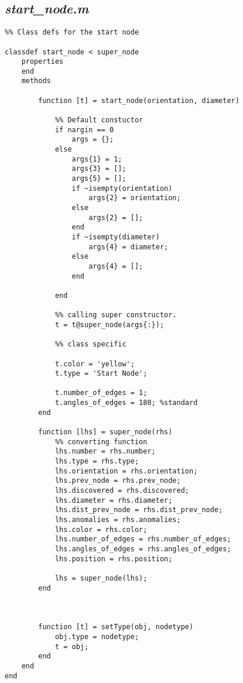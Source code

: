 \subsection{\emph{start\_node.m}}

\begin{lstlisting}
%% Class defs for the start node
 
classdef start_node < super_node
    properties
    end
    methods
        
        function [t] = start_node(orientation, diameter)
            
            %% Default constuctor
            if nargin == 0
                args = {};
            else
                args{1} = 1;
                args{3} = [];
                args{5} = [];
                if ~isempty(orientation)
                    args{2} = orientation;
                else 
                    args{2} = [];
                end
                if ~isempty(diameter)
                    args{4} = diameter;
                else
                    args{4} = [];
                end
                
            end
            
            %% calling super constructor.
            t = t@super_node(args{:});
            
            %% class specific
            
            t.color = 'yellow';
            t.type = 'Start Node';
            
            t.number_of_edges = 1;
            t.angles_of_edges = 180; %standard  
        end
        
        function [lhs] = super_node(rhs)
            %% converting function
            lhs.number = rhs.number;
            lhs.type = rhs.type;
            lhs.orientation = rhs.orientation;
            lhs.prev_node = rhs.prev_node;
            lhs.discovered = rhs.discovered;
            lhs.diameter = rhs.diameter;
            lhs.dist_prev_node = rhs.dist_prev_node;
            lhs.anomalies = rhs.anomalies;
            lhs.color = rhs.color;
            lhs.number_of_edges = rhs.number_of_edges;
            lhs.angles_of_edges = rhs.angles_of_edges;
            lhs.position = rhs.position;
            
            lhs = super_node(lhs);            
        end
        
 
       
        function [t] = setType(obj, nodetype)
            obj.type = nodetype;
            t = obj;
        end
    end
end

\end{lstlisting}

